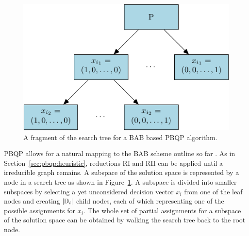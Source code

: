 \begin{figure}
  \begin{center}



    \includegraphics{fig/pgf-fig005}
  \end{center}
  \caption{A fragment of the search tree for a BAB based PBQP algorithm.}
  \label{fig:pbqp:bab-tree}
\end{figure}

PBQP allows for a natural mapping to the BAB scheme outline so far
\cite{DBLP:conf/jmlc/HamesS06}. As in
Section~\ref{sec:pbqp:heuristic}, reductions RI and RII can be applied
until a irreducible graph remains. A subspace of the solution space is
represented by a node in a search tree as shown in
Figure~\ref{fig:pbqp:bab-tree}. A subspace is divided into smaller
subspaces by selecting a yet unconsidered decision vector $x_i$ from
one of the leaf nodes and creating $|\mathbb D_i|$ child nodes, each
of which representing one of the possible assignments for $x_i$. The
whole set of partial assignments for a subspace of the solution space
can be obtained by walking the search tree back to the root node.

